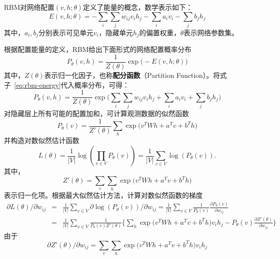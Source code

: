 RBM对网络配置$(v,h;\theta)$定义了能量的概念，数学表示如下：
\begin{equation}\label{eq:rbm-energy}
    E(v,h;\theta) = - \sum\limits_{i}\sum\limits_{j} w_{ij} v_i h_j - \sum\limits_{i} a_i v_i - \sum\limits_{j} b_j h_j
\end{equation}
其中，$a_i,b_j$分别表示可见单元$v_i$，隐藏单元$h_j$的偏置权重，$\theta$表示网络参数集。

根据配置能量的定义，RBM给出下面形式的网络配置概率分布
\begin{equation}
    P_{\theta}(v,h) = \frac{1}{Z(\theta)} \exp\big(-E(v,h;\theta)\big)
\end{equation}
其中，$Z(\theta)$表示归一化因子，也称\textbf{配分函数}（Partition Function）。将式子~\eqref{eq:rbm-energy}代入概率分布，可得：
\begin{equation}\label{eq:rbm-distribution}
    P_{\theta}(v,h) = \frac{1}{Z(\theta)} \exp\big(\sum\limits_{i}\sum\limits_{j} w_{ij} v_i h_j + \sum\limits_{i} a_i v_i + \sum\limits_{j} b_j h_j\big)
\end{equation}
对隐藏层上所有可能的配置加和，可计算观测数据的似然函数
\begin{equation}
    P_{\theta}(v) = \frac{1}{Z'(\theta)} \sum\limits_{h} \exp\big(v^T W h + a^T v + b^T h\big)
\end{equation}
并构造对数似然估计函数
\begin{equation}\label{eq:likelihood-estimation}
    L(\theta) = \frac{1}{|V|} \log(\prod\limits_{v\in V} P_{\theta}(v)) = \frac{1}{|V|} \sum\limits_{v\in V} \log(P_{\theta}(v)).
\end{equation}
其中，
\[
    Z'(\theta) = \sum\limits_{v} \sum\limits_{h} \exp\big(v^T W h + a^T v + b^T h\big)
\]
表示归一化项。根据最大似然估计方法，计算对数似然函数的梯度
\begin{equation}
    \begin{array}{lll}
      \partial L(\theta)/\partial w_{ij} & = & \frac{1}{|V|}  \sum\limits_{v\in V} \partial \log(P_{\theta}(v))/\partial w_{ij} = \frac{1}{|V|} \sum\limits_{v\in V} \frac{1}{P_{\theta}(v)} \frac{\partial P_{\theta}(v)}{\partial w_{ij}} \\
       & = & \frac{1}{|V|} \sum\limits_{v\in V} \frac{1}{P_{\theta}(v) Z'(\theta)} \big\{\sum\limits_{h} \exp\big(v^T W h + a^T v + b^T h\big) v_i h_j - P_{\theta}(v) \frac{\partial Z'(\theta)}{\partial w_{ij}} \big\}
   \end{array}
\end{equation}
由于
\begin{equation}
    \partial Z'(\theta)/\partial w_{ij} = \sum\limits_{v} \sum\limits_{h} \exp\big(v^T W h + a^T v + b^T h\big) v_i h_j
\end{equation}
